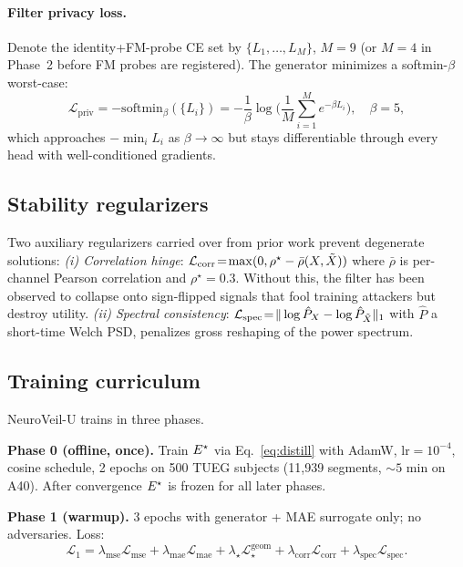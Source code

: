 \paragraph{Filter privacy loss.} Denote the identity+FM-probe CE set by $\{L_1,\ldots,L_{M}\}$, $M\!=\!9$ (or $M\!=\!4$ in Phase~2 before FM probes are registered). The generator minimizes a softmin-$\beta$ worst-case:
\begin{equation}
\mathcal{L}_{\text{priv}} = -\mathrm{softmin}_\beta(\{L_i\}) = -\frac{1}{\beta}\log\!\Biggl(\frac{1}{M}\sum_{i=1}^M e^{-\beta L_i}\Biggr),\quad \beta\!=\!5,
\end{equation}
which approaches $-\min_i L_i$ as $\beta\!\to\!\infty$ but stays differentiable through every head with well-conditioned gradients.

\subsection{Stability regularizers}
\label{sec:stability}

Two auxiliary regularizers carried over from prior work prevent degenerate solutions:
\emph{(i) Correlation hinge}: $\mathcal{L}_{\text{corr}}\!=\!\max(0,\rho^\star - \bar{\rho}(X,\tilde{X}))$ where $\bar{\rho}$ is per-channel Pearson correlation and $\rho^\star\!=\!0.3$. Without this, the filter has been observed to collapse onto sign-flipped signals that fool training attackers but destroy utility.
\emph{(ii) Spectral consistency}: $\mathcal{L}_{\text{spec}}\!=\!\|\log\hat P_X - \log\hat P_{\tilde{X}}\|_1$ with $\hat P$ a short-time Welch PSD, penalizes gross reshaping of the power spectrum.

\subsection{Training curriculum}
\label{sec:curriculum}

NeuroVeil-U trains in three phases.

\textbf{Phase 0 (offline, once).} Train $E^{\star}$ via Eq.~\ref{eq:distill} with AdamW, $\mathrm{lr}\!=\!10^{-4}$, cosine schedule, 2 epochs on 500 TUEG subjects (11{,}939 segments, ${\sim}5$ min on A40). After convergence $E^{\star}$ is frozen for all later phases.

\textbf{Phase 1 (warmup).} 3 epochs with generator + MAE surrogate only; no adversaries. Loss:
\begin{equation}
\mathcal{L}_1 = \lambda_{\text{mse}}\mathcal{L}_{\text{mse}} + \lambda_{\text{mae}}\mathcal{L}_{\text{mae}} + \lambda_\star\mathcal{L}_\star^{\text{geom}} + \lambda_{\text{corr}}\mathcal{L}_{\text{corr}} + \lambda_{\text{spec}}\mathcal{L}_{\text{spec}}.
\end{equation}

